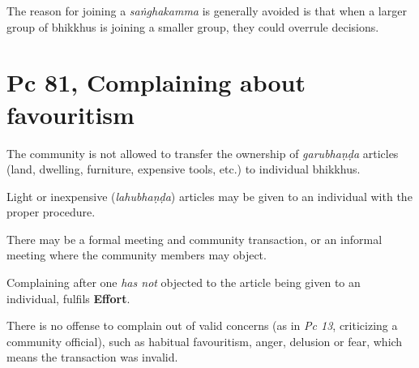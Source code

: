 The reason for joining a \emph{saṅghakamma} is generally avoided is that
when a larger group of bhikkhus is joining a smaller group, they could
overrule decisions.

\clearpage

\section{Pc 81, Complaining about favouritism}

The community is not allowed to transfer the ownership of
\emph{garubhaṇḍa} articles (land, dwelling, furniture, expensive tools,
etc.) to individual bhikkhus.

Light or inexpensive (\emph{lahubhaṇḍa}) articles may be given to an
individual with the proper procedure.

There may be a formal meeting and community transaction, or an informal
meeting where the community members may object.

Complaining after one \emph{has not} objected to the article being given
to an individual, fulfils \textbf{Effort}.

There is no offense to complain out of valid concerns (as in \emph{Pc
13}, criticizing a community official), such as habitual favouritism,
anger, delusion or fear, which means the transaction was invalid.

